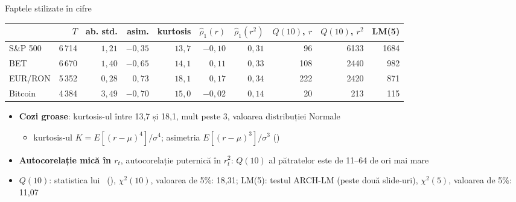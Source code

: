 \begin{frame}{Faptele stilizate în cifre}
\itemsize{\footnotesize}
\begin{center}
\scriptsize
\begin{tabular}{lrrrrrrrrr}
\toprule
& $T$ & ab. std. & asim. & kurtosis & $\hat\rho_1(r)$ & $\hat\rho_1(r^2)$ & $Q(10)$, $r$ & $Q(10)$, $r^2$ & LM(5) \\
\midrule
S\&P 500 & 6\,714 & $1{,}21$ & $\ensuremath{-}0{,}35$ & $13{,}7$ & $\ensuremath{-}0{,}10$ & $0{,}31$ & 96 & 6133 & 1684 \\
BET & 6\,670 & $1{,}40$ & $\ensuremath{-}0{,}65$ & $14{,}1$ & $0{,}11$ & $0{,}33$ & 108 & 2440 & 982 \\
EUR/RON & 5\,352 & $0{,}28$ & $0{,}73$ & $18{,}1$ & $0{,}17$ & $0{,}34$ & 222 & 2420 & 871 \\
Bitcoin & 4\,384 & $3{,}49$ & $\ensuremath{-}0{,}70$ & $15{,}0$ & $\ensuremath{-}0{,}02$ & $0{,}14$ & 20 & 213 & 115 \\
\bottomrule
\end{tabular}
\end{center}
\begin{itemize}
    \item \textbf{Cozi groase}: kurtosis-ul între 13{,}7 și 18{,}1, mult peste 3, valoarea distribuției Normale
    \begin{itemize}
        \item kurtosis-ul $K = E[(r - \mu)^4]/\sigma^4$; asimetria $E[(r - \mu)^3]/\sigma^3$ ()
    \end{itemize}
    \item \textbf{Autocorelație mică în $r_t$}, autocorelație puternică în $r_t^2$: $Q(10)$ al pătratelor este de 11--64 de ori mai mare
    \item $Q(10)$: statistica lui \ (), $\chi^2(10)$, valoarea de 5\%: 18,31; LM(5): testul ARCH-LM (peste două slide-uri), $\chi^2(5)$, valoarea de 5\%: 11{,}07
\end{itemize}
\end{frame}

